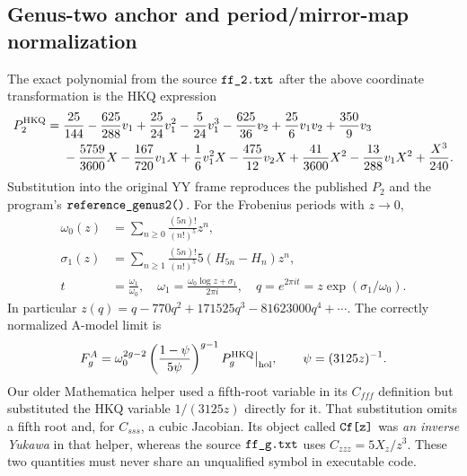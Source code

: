 \subsection{Genus-two anchor and period/mirror-map normalization}
The exact polynomial from the source $\code{ff_2.txt}$ after the above coordinate
transformation is the HKQ expression
\begin{align}\label{eq:2026P2}
 P_2^{\rm HKQ}={}&\frac{25}{144}-\frac{625}{288}v_1
 +\frac{25}{24}v_1^2-\frac5{24}v_1^3
 -\frac{625}{36}v_2+\frac{25}{6}v_1v_2+\frac{350}{9}v_3\notag\\
 &-\frac{5759}{3600}X-\frac{167}{720}v_1X
 +\frac16v_1^2X-\frac{475}{12}v_2X
 +\frac{41}{3600}X^2-\frac{13}{288}v_1X^2+\frac{X^3}{240}.
\end{align}
Substitution into the original YY frame reproduces the published $P_2$
and the program's $\code{reference_genus2()}$.
For the Frobenius periods with $z\to0$,
\begin{align}
\omega_0(z)&=\sum_{n\ge0}\frac{(5n)!}{(n!)^5}z^n,\\
\sigma_1(z)&=\sum_{n\ge1}\frac{(5n)!}{(n!)^5}
 5(H_{5n}-H_n)z^n,\\
 t&=\frac{\omega_1}{\omega_0},\quad
 \omega_1=\frac{\omega_0\log z+\sigma_1}{2\pi i},\quad
 q=e^{2\pi i t}=z\exp(\sigma_1/\omega_0).
\end{align}
In particular $z(q)=q-770q^2+171525q^3-81623000q^4+\cdots$.
The correctly normalized A-model limit is
\begin{equation}\label{eq:2026hol}
 F_g^A=\omega_0^{2g-2}
 \left(\frac{1-\psi}{5\psi}\right)^{g-1}
 P_g^{\rm HKQ}\big|_{\mathrm{hol}},\qquad \psi=(3125z)^{-1}.
\end{equation}
Our older Mathematica  helper used a fifth-root
variable in its $C_{fff}$ definition but substituted the HKQ variable
$1/(3125z)$ directly for it. That substitution omits a fifth root and,
for $C_{sss}$, a cubic Jacobian. Its object called $\code{Cf[z]}$ was
\emph{an inverse Yukawa} in that helper, whereas the source $\code{ff_g.txt}$
uses $C_{zzz}=5X_z/z^3$. These two quantities must never share an
unqualified symbol in executable code.

